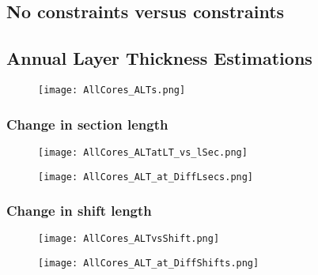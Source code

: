 \documentclass[../../CompleteThesis2/Complete_2ndDraft]{subfiles}
\begin{document}
\subsection[Constraints or No Constraints]{No constraints versus constraints}
\label{Subsec:Method_TestStab_ConstNoConst}


\subsection[ALT Estimation]{Annual Layer Thickness Estimations}
\label{Subsec:Method_TestStab_ALTest}

\begin{figure}[h]
	\centering
	\texttt{[image: AllCores\_ALTs.png]}
	\caption[]{\footnotesize }
	\label{fig:AllCores_ALTs}
\end{figure}


\subsubsection[Change in $l_{sec}$]{Change in section length}
\label{Subsubsec:Method_TestStab_ALTest_ChangeLsec}

\begin{figure}[h]
	\centering
	\texttt{[image: AllCores\_ALTatLT\_vs\_lSec.png]}
	\caption[]{\footnotesize }
	\label{fig:AllCores_ALTatLT_vs_lSec}
\end{figure}
\begin{figure}[h]
	\centering
	\texttt{[image: AllCores\_ALT\_at\_DiffLsecs.png]}
	\caption[]{\footnotesize }
	\label{fig:AllCores_ALT_at_DiffLsecs}
\end{figure}



\subsubsection[Change in $l_{shift}$]{Change in shift length}
\label{Subsubsec:Method_TestStab_ALTest_ChangeLshift}

\begin{figure}[h]
	\centering
	\texttt{[image: AllCores\_ALTvsShift.png]}
	\caption[]{\footnotesize }
	\label{fig:AllCores_ALTvsShift}
\end{figure}
\begin{figure}[h]
	\centering
	\texttt{[image: AllCores\_ALT\_at\_DiffShifts.png]}
	\caption[]{\footnotesize }
	\label{fig:AllCores_ALT_at_DiffShifts}
\end{figure}
\end{document}
